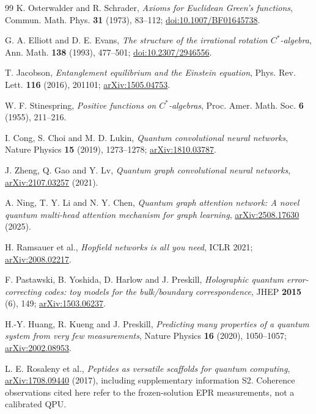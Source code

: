 \documentclass[11pt,oneside,openany]{book}
\theoremstyle{definition}\newtheorem{definition}[theorem]{Definition}
\theoremstyle{remark}\newtheorem{remark}[theorem]{Remark}
\begin{document}
\begin{thebibliography}{99}
K. Osterwalder and R. Schrader, \emph{Axioms for Euclidean Green's functions},
Commun. Math. Phys. \textbf{31} (1973), 83--112;
\href{https://doi.org/10.1007/BF01645738}{doi:10.1007/BF01645738}.

G. A. Elliott and D. E. Evans, \emph{The structure of the irrational rotation
$C^*$-algebra}, Ann. Math. \textbf{138} (1993), 477--501;
\href{https://doi.org/10.2307/2946556}{doi:10.2307/2946556}.

T. Jacobson, \emph{Entanglement equilibrium and the Einstein equation},
Phys. Rev. Lett. \textbf{116} (2016), 201101;
\href{https://arxiv.org/abs/1505.04753}{arXiv:1505.04753}.

W. F. Stinespring, \emph{Positive functions on $C^*$-algebras},
Proc. Amer. Math. Soc. \textbf{6} (1955), 211--216.

I. Cong, S. Choi and M. D. Lukin, \emph{Quantum convolutional neural networks},
Nature Physics \textbf{15} (2019), 1273--1278;
\href{https://arxiv.org/abs/1810.03787}{arXiv:1810.03787}.

J. Zheng, Q. Gao and Y. Lv, \emph{Quantum graph convolutional neural networks},
\href{https://arxiv.org/abs/2107.03257}{arXiv:2107.03257} (2021).

A. Ning, T. Y. Li and N. Y. Chen, \emph{Quantum graph attention network:
A novel quantum multi-head attention mechanism for graph learning},
\href{https://arxiv.org/abs/2508.17630}{arXiv:2508.17630} (2025).

H. Ramsauer et al., \emph{Hopfield networks is all you need}, ICLR 2021;
\href{https://arxiv.org/abs/2008.02217}{arXiv:2008.02217}.

F. Pastawski, B. Yoshida, D. Harlow and J. Preskill, \emph{Holographic quantum
error-correcting codes: toy models for the bulk/boundary correspondence},
JHEP \textbf{2015} (6), 149;
\href{https://arxiv.org/abs/1503.06237}{arXiv:1503.06237}.

H.-Y. Huang, R. Kueng and J. Preskill, \emph{Predicting many properties of a
quantum system from very few measurements}, Nature Physics \textbf{16}
(2020), 1050--1057;
\href{https://arxiv.org/abs/2002.08953}{arXiv:2002.08953}.

L. E. Rosaleny et al., \emph{Peptides as versatile scaffolds for quantum computing},
\href{https://arxiv.org/abs/1708.09440}{arXiv:1708.09440} (2017),
including supplementary information S2. Coherence observations cited here
refer to the frozen-solution EPR measurements, not a calibrated QPU.


\end{thebibliography}
\end{document}
